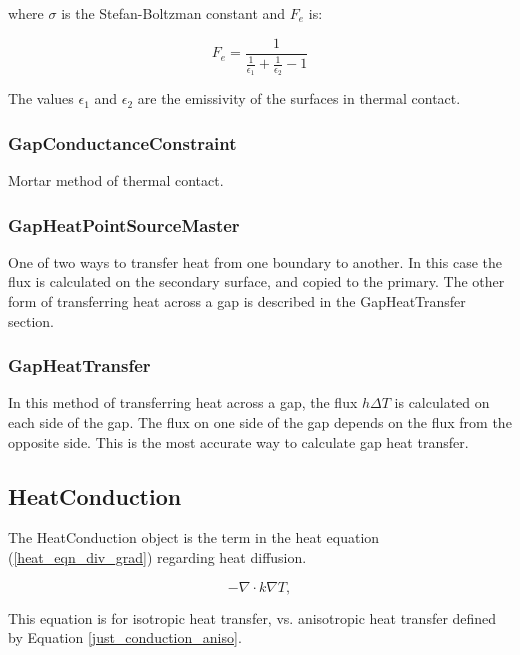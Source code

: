 \documentclass[preprint,5p]{elsarticle}
\begin{document}
where $\sigma$ is the Stefan-Boltzman constant and $F_e$ is:

\begin{equation*}
F_e = \frac{1}{\frac{1}{\epsilon_1} + \frac{1}{\epsilon_2} - 1}
\end{equation*}

The values $\epsilon_1$ and $\epsilon_2$ are the emissivity of the surfaces in thermal contact.

\subsubsection{GapConductanceConstraint}
Mortar method of thermal contact.

\subsubsection{GapHeatPointSourceMaster}
One of two ways to transfer heat from one boundary to another. In this case the flux is calculated on the secondary surface, and copied to the primary. The other form of transferring heat across a gap is described in the GapHeatTransfer section.

\subsubsection{GapHeatTransfer}
In this method of transferring heat across a gap, the flux $h\Delta T$ is calculated on each side of the gap. The flux on one side of the gap depends on the flux from the opposite side. This is the most accurate way to calculate gap heat transfer.

\subsection{HeatConduction}
The HeatConduction object is the term in the heat equation (\ref{heat_eqn_div_grad}) regarding heat diffusion.

\begin{equation}
- \nabla \cdot  k\nabla T,
\end{equation}

This equation is for isotropic heat transfer, vs. anisotropic heat transfer defined by Equation \ref{just_conduction_aniso}.
\end{document}
